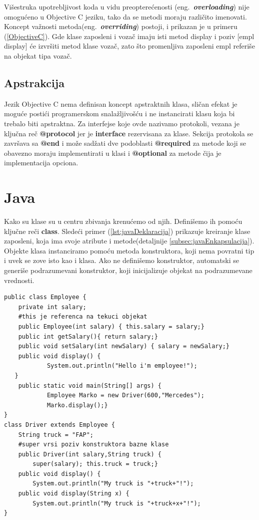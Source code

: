 \documentclass[a4paper]{article}
\begin{document}
Višestruka upotrebljivost koda u vidu preopterećenosti (eng.~\textbf{\em overloading}) nije omogućeno u Objective C jeziku, tako da se metodi moraju različito imenovati\cite{ObjectiveCbook}. Koncept važnosti metoda(eng.~\textbf{\em overriding})  postoji, i prikazan je u primeru (\ref{ObjectiveC}). Gde klase zaposleni i vozač imaju isti metod display i poziv [empl display] će izvršiti metod klase vozač, zato što promenljiva zaposleni empl referiše na objekat tipa vozač.

\subsection{Apstrakcija}
\label{subsec:ObjCApstrakcija}

Jezik Objective C nema definisan koncept apstraktnih klasa\cite{ObjectiveCbook}, sličan efekat je moguće postići programerskom snalažljivošću i ne instancirati klasu koja bi trebalo biti apstraktna. Za interfejse koje ovde nazivamo protokoli, vezana je ključna reč \textbf{@protocol} jer je \textbf{interface} rezervisana za klase. Sekcija protokola se završava sa \textbf{@end} i može sadžati dve podoblasti \textbf{@required} za metode koji se obavezno moraju implementirati u klasi i \textbf{@optional} za metode čija je implementacija opciona.

\section{Java}
\label{sec:java}

Kako su klase su u centru zbivanja krenućemo od njih. Definišemo ih pomoću ključne reči \textbf{class}. Sledeći primer (\ref{lst:javaDeklaracija}) prikazuje kreiranje klase zaposleni, koja ima svoje atribute i metode(detaljnije \ref{subsec:javaEnkapsulacija}). Objekte klasa instanciramo pomoću metoda konstruktora, koji nema povratni tip i uvek se zove isto kao i klasa. Ako ne definišemo konstruktor, automatski se generiše podrazumevani konstruktor\cite{horstmann2017core}, koji inicijalizuje objekat na podrazumevane vrednosti.

\begin{lstlisting}[caption={Primer deklarisanja klase sa enkapsulacijom i nasleđivanjem},frame=single, label=lst:javaDeklaracija]
public class Employee {
	private int salary;
	#this je referenca na tekuci objekat
	public Employee(int salary) { this.salary = salary;}
 	public int getSalary(){ return salary;}
	public void setSalary(int newSalary) { salary = newSalary;}
	public void display() {
     		System.out.println("Hello i'm employee!");
   }
	public static void main(String[] args) {
    		Employee Marko = new Driver(600,"Mercedes");
    		Marko.display();}    
}
class Driver extends Employee {
  	String truck = "FAP";
	#super vrsi poziv konstruktora bazne klase
   	public Driver(int salary,String truck) {
		super(salary); this.truck = truck;}
  	public void display() {
		System.out.println("My truck is "+truck+"!");
	public void display(String x) {
		System.out.println("My truck is "+truck+x+"!");
}
\end{lstlisting}
\end{document}
